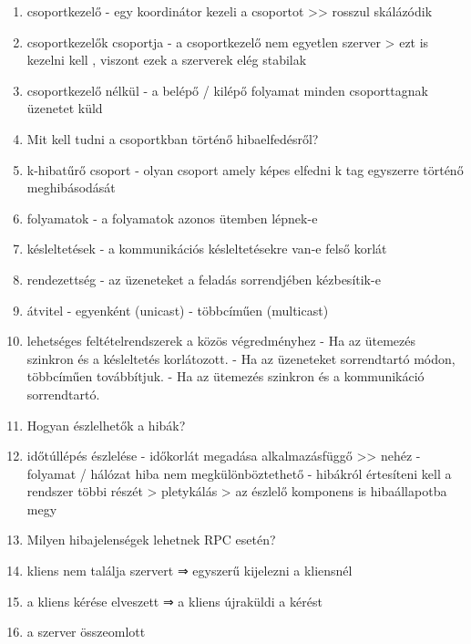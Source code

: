 \documentclass[twoside, a4paper, 12pt]{article}
\begin{document}
\begin{enumerate}
            \item csoportkezelő
                - egy koordinátor kezeli a csoportot
                >> rosszul skálázódik
            \item csoportkezelők csoportja
                - a csoportkezelő nem egyetlen szerver
                > ezt is kezelni kell , viszont ezek a szerverek elég stabilak
            \item csoportkezelő nélkül
                - a belépő / kilépő folyamat minden csoporttagnak üzenetet küld
            \item  Mit kell tudni a csoportkban történő hibaelfedésről?
            \item k-hibatűrő csoport
                - olyan csoport amely képes elfedni k tag egyszerre történő meghibásodását
            \item folyamatok
                - a folyamatok azonos ütemben lépnek-e
            \item késleltetések
                - a kommunikációs késleltetésekre van-e felső korlát
            \item rendezettség
                - az üzeneteket a feladás sorrendjében kézbesítik-e
            \item átvitel
                - egyenként (unicast)
                - többcíműen (multicast)
            \item lehetséges feltételrendszerek a közös végredményhez 
                - Ha az ütemezés szinkron és a késleltetés korlátozott.
                - Ha az üzeneteket sorrendtartó módon, többcíműen továbbítjuk.
                - Ha az ütemezés szinkron és a kommunikáció sorrendtartó.
            \item  Hogyan észlelhetők a hibák?
            \item időtúllépés észlelése
                - időkorlát megadása alkalmazásfüggő >> nehéz
                - folyamat / hálózat hiba nem megkülönböztethető
                - hibákról értesíteni kell a rendszer többi részét
                > pletykálás
                > az észlelő komponens is hibaállapotba megy
            \item  Milyen hibajelenségek lehetnek RPC esetén?
            \item  kliens nem találja  szervert
                ⇒ egyszerű kijelezni a kliensnél
            \item a kliens kérése elveszett
                ⇒ a kliens újraküldi a kérést
            \item a szerver összeomlott

\end{enumerate}
\end{document}
